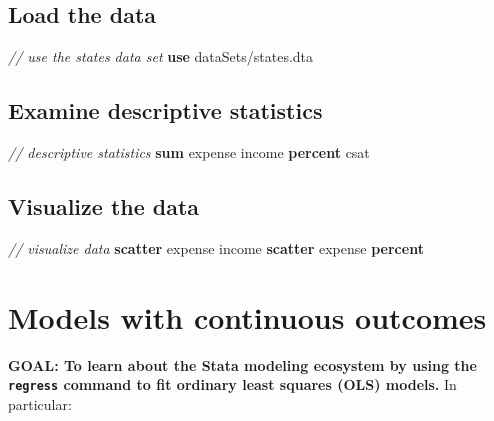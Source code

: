 \documentclass[
]{book}
\newenvironment{Shaded}{\begin{snugshade}}{\end{snugshade}}
\newcommand{\CommentTok}[1]{\textcolor[rgb]{0.56,0.35,0.01}{\textit{#1}}}
\newcommand{\KeywordTok}[1]{\textcolor[rgb]{0.13,0.29,0.53}{\textbf{#1}}}
\newcommand{\NormalTok}[1]{#1}
\begin{document}
\hypertarget{load-the-data-1}{%
\subsection{Load the data}\label{load-the-data-1}}

\begin{Shaded}
\begin{Highlighting}[]
\CommentTok{// use the states data set}
\KeywordTok{use}\NormalTok{ dataSets/states.dta}
\end{Highlighting}
\end{Shaded}

\hypertarget{examine-descriptive-statistics}{%
\subsection{Examine descriptive statistics}\label{examine-descriptive-statistics}}

\begin{Shaded}
\begin{Highlighting}[]
\CommentTok{// descriptive statistics }
\KeywordTok{sum}\NormalTok{ expense income }\KeywordTok{percent}\NormalTok{ csat}
\end{Highlighting}
\end{Shaded}

\hypertarget{visualize-the-data}{%
\subsection{Visualize the data}\label{visualize-the-data}}

\begin{Shaded}
\begin{Highlighting}[]
\CommentTok{// visualize data }
\KeywordTok{scatter}\NormalTok{ expense income}
\KeywordTok{scatter}\NormalTok{ expense }\KeywordTok{percent} 
\end{Highlighting}
\end{Shaded}

\hypertarget{models-with-continuous-outcomes-1}{%
\section{Models with continuous outcomes}\label{models-with-continuous-outcomes-1}}

\textbf{GOAL: To learn about the Stata modeling ecosystem by using the \texttt{regress} command to fit ordinary least squares (OLS) models.} In particular:
\end{document}
